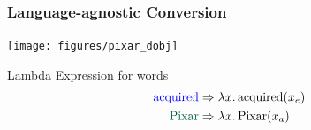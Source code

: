 \documentclass[mathserif,12pt]{beamer}
\newcommand \ignore[1]{}
\newcommand{\hlight}[1]{{\color{blue!80} #1}}
\renewcommand{\land}{\wedge}
\newcommand{\lspace}{.\,}
\begin{document}
\begin{frame}[noframenumbering]
\frametitle{Language-agnostic Conversion}
\vspace{-2.4em}
\begin{center}
\texttt{[image: figures/pixar\_dobj]}

\end{center}

\vspace{1cm}

\begin{block}{\centering Lambda Expression for words}
\vspace{-0.5cm}
\begin{align*}
  \hbox{\color{blue} acquired} & \Rightarrow  \lambda x \lspace \hbox{acquired}(x_e)  \\
  \hbox{\color{blue!40!green!60!black} Pixar} & \Rightarrow  \lambda x \lspace \hbox{Pixar}(x_a) 
\end{align*}
\vspace{-0.5cm}
\end{block}
\end{frame}

\ignore{
\begin{frame}
\frametitle{Language-agnostic Conversion}
\vspace{-2.4em}
\begin{center}
\texttt{[image: figures/pixar\_dobj]}

\end{center}

\vspace{1cm}

\begin{block}{\centering Lambda Expression for dependency labels}
\vspace{-0.5cm}
\begin{align*}
  \hbox{\alert{dobj}} & \Rightarrow  \lambda \hlight{\mathbf{f}}\;\; \lambda {\color{blue!40!green!60!black} \mathbf{g}}\;\; \lambda \hlight{\mathbf{z}}\; \lspace \; \exists {\color{blue!40!green!60!black} \mathbf{x}}\; \lspace \; \hlight{\mathbf{f(z)}}\;\;\; \land \;\;\; {\color{blue!40!green!60!black} \mathbf{g(x)}}  \;\;\; \land\;\;\; \alert{\mathbf{arg_2}}(\hlight{\mathbf{z_e}}, {\color{blue!40!green!60!black} \mathbf{x_a}})
\end{align*}
\vspace{-0.5cm}
\end{block}
\end{frame}
}
\end{document}
